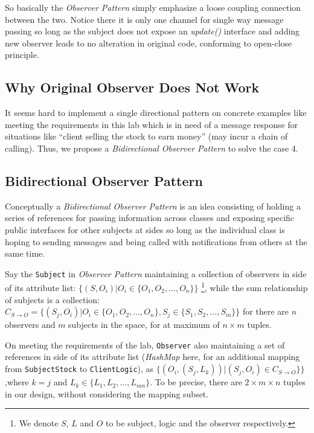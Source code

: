 \documentclass[a4paper]{article}
\begin{document}
So basically the \textit{Observer Pattern} simply emphasize a
loose coupling connection between the two. Notice there it is only one channel
for single way message passing so long as the subject does not expose an \textsl{update()} interface
and adding new observer leads to no alteration in original code, conforming to open-close principle.

\subsection{Why Original Observer Does Not Work}%
\label{sub:why_original_observer_does_not_work}

It seems hard to implement a single directional pattern on concrete examples
like meeting the requirements in this lab which is in need of
a message response for situations like ``client selling the stock to earn
money'' (may incur a chain of calling). Thus, we propose a
\textit{Bidirectional Observer Pattern} to solve the case 4.

\subsection{Bidirectional Observer Pattern}%
\label{sub:bidirectional_observer_pattern}

Conceptually a \textit{Bidirectional Observer Pattern} is an idea
consisting of holding a series of references for passing information across classes
and exposing specific public interfaces for other subjects
at sides so long as the individual class is hoping to sending
messages and being called with notifications from others at the same time.

 Say the \texttt{Subject} in \textit{Observer Pattern}
maintaining a collection of observers  in side of its attribute list:
$\{\left(S, O_i\right)|O_i \in \{ O_1, O_2, \ldots, O_n\}\}$
\footnote{We denote $S$, $L$ and $O$ to be subject, logic and the observer respectively.}, while the sum
relationship of subjects is a collection: $C_{S \to O} = \{\left(S_j, O_i\right)|O_i \in \{ O_1, O_2, \ldots, O_n\},
S_j \in \{ S_1, S_2, \ldots, S_m\}\}$ for there are $n$ observers and $m$ subjects in
the space, for at maximum of $n \times m$ tuples.

On meeting the requirements of the lab, \texttt{Observer} also
maintaining a set of references in side of its attribute list (\textsl{HashMap} here, for
an additional mapping from \texttt{SubjectStock} to \texttt{ClientLogic}), as
$\{ \left( O_i, \left( S_j, L_k \right)  \right) | \left( S_j, O_i \right) \in C_{S \to O} \}
 \}$ ,where $ k = j $ and $L_k \in \{ L_1, L_2, \ldots, L_{mn} \} $.
To be precise, there are $2 \times m \times n$ tuples in our design, without considering
the mapping subset.
\end{document}
